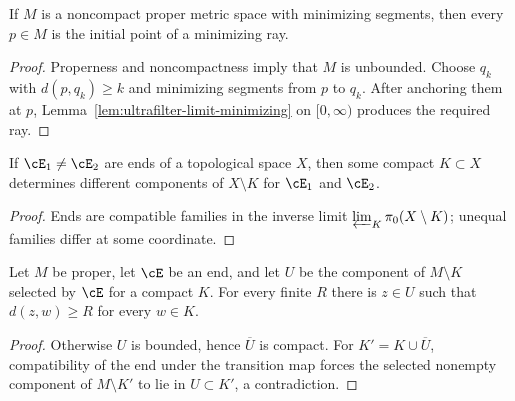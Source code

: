 \begin{lemma}
\label{lem:ray-exists-metric}
\leanok




If $M$ is a noncompact proper metric space with minimizing segments,
then every $p\in M$ is the initial point of a minimizing ray.
\end{lemma}
\begin{proof}
\sketch
\leanok
{}
Properness and noncompactness imply that $M$ is unbounded. Choose
$q_k$ with $d(p,q_k)\ge k$ and minimizing segments from $p$ to $q_k$.
After anchoring them at $p$, Lemma~\ref{lem:ultrafilter-limit-minimizing}
on $[0,\infty)$ produces the required ray.
\end{proof}

\begin{lemma}
\label{lem:ends-differ-at-compact}
\leanok



If $\cE_1\ne\cE_2$ are ends of a topological space $X$, then some
compact $K\subset X$ determines different components of $X\setminus K$
for $\cE_1$ and $\cE_2$.
\end{lemma}
\begin{proof}
\sketch
\leanok
Ends are compatible families in the inverse limit
$\varprojlim_K\pi_0(X\setminus K)$; unequal families differ at some
coordinate.
\end{proof}

\begin{lemma}
\label{lem:end-component-unbounded}
\leanok




Let $M$ be proper, let $\cE$ be an end, and let $U$ be the component of
$M\setminus K$ selected by $\cE$ for a compact $K$. For every finite
$R$ there is $z\in U$ such that $d(z,w)\ge R$ for every $w\in K$.
\end{lemma}
\begin{proof}
\sketch
\leanok
{}
Otherwise $U$ is bounded, hence $\overline U$ is compact. For
$K'=K\cup\overline U$, compatibility of the end under the transition
map forces the selected nonempty component of $M\setminus K'$ to lie in
$U\subset K'$, a contradiction.
\end{proof}

